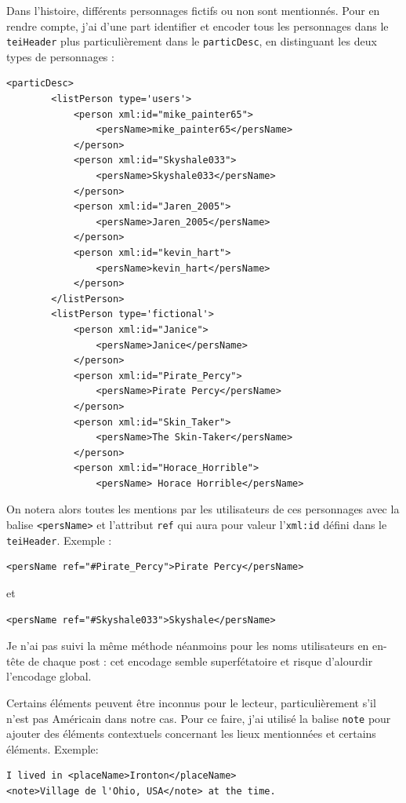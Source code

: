 \documentclass[onecolumn,12pt]{article}
\begin{document}

Dans l'histoire, différents personnages fictifs ou non sont mentionnés. Pour en rendre compte, j'ai d'une part identifier et encoder tous les personnages dans le \texttt{teiHeader} plus particulièrement dans le \texttt{particDesc}, en distinguant les deux types de personnages : 


\begin{singlespace}
\begin{verbatim}
<particDesc>
        <listPerson type='users'>
            <person xml:id="mike_painter65">
                <persName>mike_painter65</persName>
            </person>
            <person xml:id="Skyshale033">
                <persName>Skyshale033</persName>
            </person>
            <person xml:id="Jaren_2005">
                <persName>Jaren_2005</persName>
            </person>
            <person xml:id="kevin_hart">
                <persName>kevin_hart</persName>
            </person>
        </listPerson>
        <listPerson type='fictional'> 
            <person xml:id="Janice">
                <persName>Janice</persName>
            </person>
            <person xml:id="Pirate_Percy">
                <persName>Pirate Percy</persName>
            </person>
            <person xml:id="Skin_Taker">
                <persName>The Skin-Taker</persName> 
            </person>
            <person xml:id="Horace_Horrible">
                <persName> Horace Horrible</persName>
\end{verbatim}
\end{singlespace}

On notera alors toutes les mentions par les utilisateurs de ces personnages avec la balise \texttt{<persName>} et l'attribut \texttt{ref} qui aura pour valeur l'\texttt{xml:id} défini dans le \texttt{teiHeader}. Exemple : 
\begin{verbatim}
<persName ref="#Pirate_Percy">Pirate Percy</persName>
\end{verbatim}
et
\begin{verbatim}
<persName ref="#Skyshale033">Skyshale</persName>
\end{verbatim}

Je n'ai pas suivi la même méthode néanmoins pour les noms utilisateurs en en-tête de chaque post : cet encodage semble superfétatoire et risque d'alourdir l'encodage global.

Certains éléments peuvent être inconnus pour le lecteur, particulièrement s'il n'est pas Américain dans notre cas. Pour ce faire, j'ai utilisé la balise \texttt{note} pour ajouter des éléments contextuels concernant les lieux mentionnées et certains éléments. Exemple:
\begin{verbatim}
I lived in <placeName>Ironton</placeName>
<note>Village de l'Ohio, USA</note> at the time. 
\end{verbatim}
\end{document}
